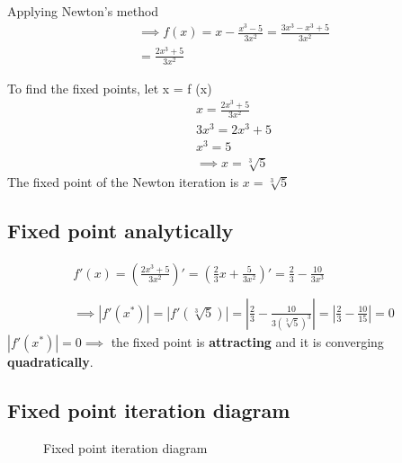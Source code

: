 Applying Newton's method\\
\begin{align*}
\implies f(x) = x - \frac{x^{3} - 5}{3x^{2}} = \frac{3x^{3} - x^{3} + 5}{3x^{2}}\\
= \frac{2x^{3} + 5}{3x^{2}} 
\end{align*}

To find the fixed points, let x = f (x)\\
\begin{align*}
x = \frac{2x^{3} + 5}{3x^{2}} \\
3x^{3} = 2x^{3} + 5  \\
x^{3} = 5 \\
\implies x = \sqrt[3]{5}
\end{align*}
The fixed point of the Newton iteration is $x= \sqrt[3]{5}$ \\

\subsection{Fixed point analytically}
\begin{align*}
    f'(x) = (\frac{2x^{3} + 5}{3x^{2}})'
    = (\frac{2}{3}x + \frac{5}{3x^{2}})'
    = \frac{2}{3} - \frac{10}{3x^{3}} \\
    \\
    \implies|f'(x^{*})| = |f'(\sqrt[3]{5})| = |\frac{2}{3} - \frac{10}{3(\sqrt[3]{5})^{3}}| = |\frac{2}{3} - \frac{10}{15}| = 0
\end{align*}
$|f'(x^{*})| = 0 \implies$ the fixed point is \textbf{attracting} and it is converging \textbf{quadratically}.

\subsection{Fixed point iteration diagram}
\begin{figure}[H]
\centering
{}
\caption{Fixed point iteration diagram}
\end{figure}

\newpage
